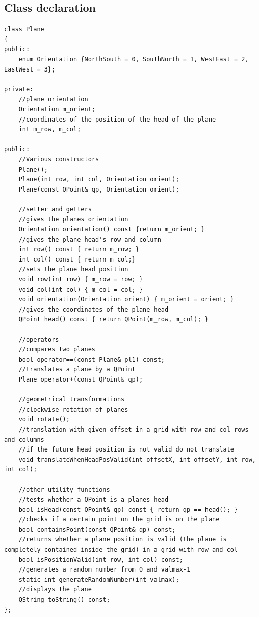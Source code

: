 \subsection{Class declaration}
\begin{lstlisting}[caption = {Plane class declaration}, captionpos = b, label=plane_declaration]
class Plane
{
public:
    enum Orientation {NorthSouth = 0, SouthNorth = 1, WestEast = 2, EastWest = 3};

private:
    //plane orientation
    Orientation m_orient;
    //coordinates of the position of the head of the plane
    int m_row, m_col;

public:
    //Various constructors
    Plane();
    Plane(int row, int col, Orientation orient);
    Plane(const QPoint& qp, Orientation orient);

    //setter and getters
    //gives the planes orientation
    Orientation orientation() const {return m_orient; }
    //gives the plane head's row and column
    int row() const { return m_row; }
    int col() const { return m_col;}
    //sets the plane head position
    void row(int row) { m_row = row; }
    void col(int col) { m_col = col; }
    void orientation(Orientation orient) { m_orient = orient; }
    //gives the coordinates of the plane head
    QPoint head() const { return QPoint(m_row, m_col); }

    //operators
    //compares two planes
    bool operator==(const Plane& pl1) const;
    //translates a plane by a QPoint
    Plane operator+(const QPoint& qp);

    //geometrical transformations
    //clockwise rotation of planes
    void rotate();
    //translation with given offset in a grid with row and col rows and columns
    //if the future head position is not valid do not translate
    void translateWhenHeadPosValid(int offsetX, int offsetY, int row, int col);

    //other utility functions
    //tests whether a QPoint is a planes head
    bool isHead(const QPoint& qp) const { return qp == head(); }
    //checks if a certain point on the grid is on the plane
    bool containsPoint(const QPoint& qp) const;
    //returns whether a plane position is valid (the plane is completely contained inside the grid) in a grid with row and col
    bool isPositionValid(int row, int col) const;
    //generates a random number from 0 and valmax-1
    static int generateRandomNumber(int valmax);
    //displays the plane
    QString toString() const;
};
\end{lstlisting}


